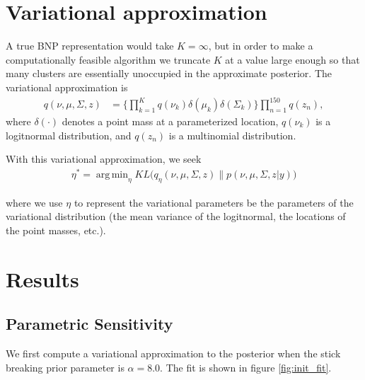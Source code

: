 \documentclass[a4paper]{article}
\DeclareMathOperator*{\argmin}{arg\,min}
\begin{document}
\section{Variational approximation}
A true BNP representation would take $K = \infty$, but in order to make a computationally feasible
algorithm we truncate $K$ at a value large enough so that many clusters are essentially unoccupied in
the approximate posterior. The variational approximation is
\begin{align}
q(\nu, \mu, \Sigma, z) & =
\Big\{\prod_{k=1}^{K}q\left(\nu_{k}\right)\delta\left(\mu_{k}\right)\delta\left(\Sigma_{k}\right)\Big\} \prod_{n=1}^{150}q\left(z_{n}\right),
\end{align}
where $\delta\left(\cdot\right)$ denotes a point mass at a parameterized
location, $q\left(\nu_{k}\right)$ is a logitnormal distribution, and $q\left(z_{n}\right)$
is a multinomial distribution.

With this variational approximation, we seek
\begin{align}
\eta^* = \argmin_{\eta} KL\Big(q_\eta(\nu, \mu, \Sigma, z) \big\| p(\nu, \mu, \Sigma, z | y)\Big) \label{eq:kl_objective}
\end{align}

where we use $\eta$ to represent the variational parameters be the parameters of the variational distribution
(the mean variance of the logitnormal, the locations of the point masses, etc.).

\section{Results}

\subsection{Parametric Sensitivity}
We first compute a variational approximation to the posterior when the stick breaking
prior parameter is $\alpha = 8.0$. The fit is shown in figure \ref{fig:init_fit}.
\end{document}
